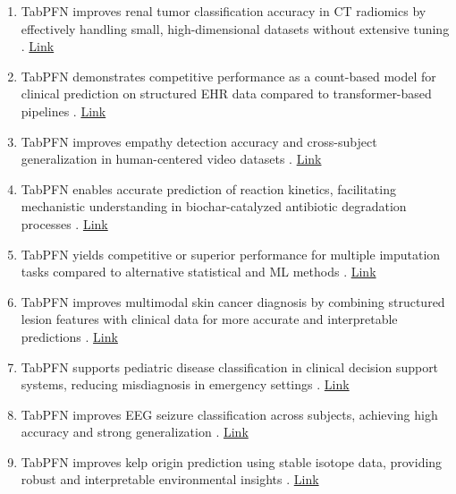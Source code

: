 \begin{enumerate}
\item TabPFN improves renal tumor classification accuracy in CT radiomics by effectively handling small, high-dimensional datasets without extensive tuning \cite{liu2025tabular}. \href{https://doi.org/10.21037/qims-2025-1132}{Link}

\item TabPFN demonstrates competitive performance as a count-based model for clinical prediction on structured EHR data compared to transformer-based pipelines \cite{gao2025countbased}. \href{http://arxiv.org/abs/2511.00782v1}{Link}

\item TabPFN improves empathy detection accuracy and cross-subject generalization in human-centered video datasets \cite{hasan2025privacypreserving}. \href{http://arxiv.org/abs/2504.10808v2}{Link}

\item TabPFN enables accurate prediction of reaction kinetics, facilitating mechanistic understanding in biochar-catalyzed antibiotic degradation processes \cite{latif2026deep}. \href{https://link.springer.com/article/10.1007/s42773-026-00606-y}{Link}

\item TabPFN yields competitive or superior performance for multiple imputation tasks compared to alternative statistical and ML methods \cite{sepin2026multiple}. \href{https://www.mdpi.com/2571-905X/9/2/38}{Link}

\item TabPFN improves multimodal skin cancer diagnosis by combining structured lesion features with clinical data for more accurate and interpretable predictions \cite{fan2026lightweight}. \href{https://www.sciencedirect.com/science/article/pii/S0020025526003609}{Link}

\item TabPFN supports pediatric disease classification in clinical decision support systems, reducing misdiagnosis in emergency settings \cite{fan2026lightweight}. \href{https://www.scitepress.org/Papers/2026/143473/143473.pdf}{Link}

\item TabPFN improves EEG seizure classification across subjects, achieving high accuracy and strong generalization \cite{obaido2026evaluating}. \href{https://doi.org/10.3390/app16073120}{Link}

\item TabPFN improves kelp origin prediction using stable isotope data, providing robust and interpretable environmental insights \cite{kang2026enhancing}. \href{https://doi.org/10.1016/j.foodchem.2026.148591}{Link}


\end{enumerate}
